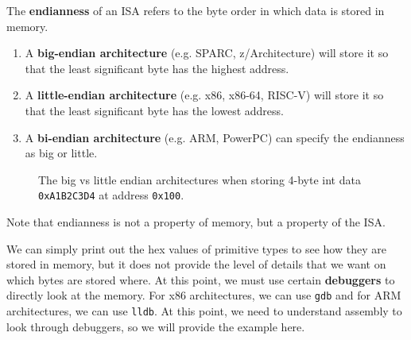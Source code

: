   \begin{definition}
    The \textbf{endianness} of an ISA refers to the byte order in which data is stored in memory. 
    \begin{enumerate} 
      \item A \textbf{big-endian architecture} (e.g. SPARC, z/Architecture) will store it so that the least significant byte has the highest address.
      \item A \textbf{little-endian architecture} (e.g. x86, x86-64, RISC-V) will store it so that the least significant byte has the lowest address. 
      \item A \textbf{bi-endian architecture} (e.g. ARM, PowerPC) can specify the endianness as big or little. 
    \end{enumerate}

    \begin{figure}[H]
      \centering 
      \caption{The big vs little endian architectures when storing 4-byte int data \texttt{0xA1B2C3D4} at address \texttt{0x100}.} 
      \label{fig:endianness}
    \end{figure}
  \end{definition}
  
  Note that endianness is not a property of memory, but a property of the ISA. 

  \begin{example}
    We can simply print out the hex values of primitive types to see how they are stored in memory, but it does not provide the level of details that we want on which bytes are stored where. At this point, we must use certain \textbf{debuggers} to directly look at the memory. For x86 architectures, we can use \texttt{gdb} and for ARM architectures, we can use \texttt{lldb}. At this point, we need to understand assembly to look through debuggers, so we will provide the example here. 
  \end{example}

